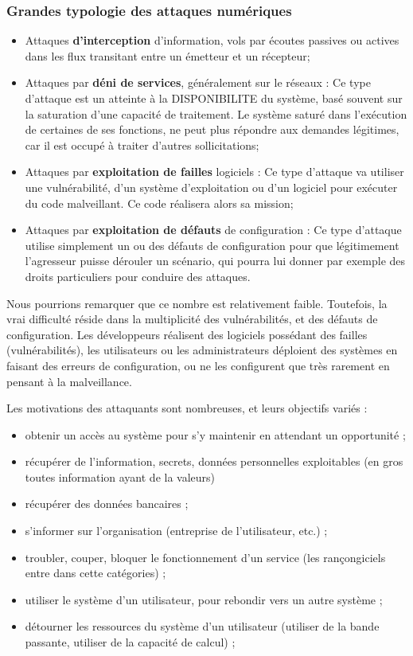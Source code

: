 \begin{frame}
\frametitle<presentation>{Grandes typologie des attaques numériques}
\begin{itemize}
\item Attaques \textbf{d’interception} d’information, vols par écoutes passives ou actives dans les flux transitant entre un émetteur et un récepteur;
\item Attaques par \textbf{déni de services}, généralement sur le réseaux : Ce type d’attaque est un atteinte à la DISPONIBILITE du système, basé souvent sur la saturation d’une capacité de traitement. Le système saturé dans l’exécution de certaines de ses fonctions, ne peut plus répondre aux demandes légitimes, car il est occupé à traiter d’autres sollicitations;
\item Attaques par \textbf{exploitation de failles }logiciels : Ce type d’attaque va utiliser une vulnérabilité, d’un système d’exploitation ou d’un logiciel pour exécuter du code malveillant. Ce code réalisera alors sa mission;
\item Attaques par \textbf{exploitation de défauts} de configuration : Ce type d’attaque utilise simplement un ou des défauts de configuration pour que légitimement  l’agresseur puisse dérouler un scénario, qui pourra lui donner par exemple des droits particuliers pour conduire des attaques.
\end{itemize}
\end{frame}

Nous pourrions remarquer que ce nombre est relativement faible. Toutefois, la vrai difficulté réside dans la multiplicité des vulnérabilités, et des défauts de configuration. Les développeurs réalisent des logiciels possédant des failles (vulnérabilités), les utilisateurs ou les administrateurs déploient des systèmes en faisant des erreurs de configuration, ou ne les configurent que très rarement en pensant à la malveillance.

Les motivations des attaquants sont nombreuses, et leurs objectifs variés :

\begin{itemize}
\item obtenir un accès au système pour s’y maintenir en attendant un opportunité ;
\item récupérer de l’information, secrets, données personnelles exploitables (en gros toutes information ayant de la valeurs)
\item récupérer des données bancaires ;
\item s'informer sur l'organisation (entreprise de l'utilisateur, etc.) ;
\item troubler, couper, bloquer le fonctionnement d'un service (les rançongiciels entre dans cette catégories) ;
\item utiliser le système d’un utilisateur, pour rebondir vers un autre système ;
\item détourner les ressources du système d’un utilisateur (utiliser de la bande passante, utiliser de la capacité de calcul) ;
\end{itemize}

